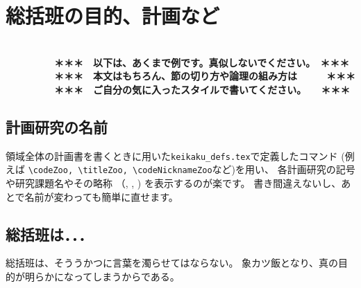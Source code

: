 \documentclass[11pt,a4j,dvipdfmx]{jarticle} 					%
\newcommand{\研究課題名}{象の卵}
\newcommand{\研究機関名}{逢坂大学}
\newcommand{\研究代表者氏名}{湯川秀樹}
\newcommand{\研究期間の最終元号年度}{7}  %
\begin{document}

\section{総括班の目的、計画など}

\JSPSInstructions	%

\textbf{\\　　　　　＊＊＊　以下は、あくまで例です。真似しないでください。　＊＊＊\\
　　　　　＊＊＊　本文はもちろん、節の切り方や論理の組み方は　　　＊＊＊\\
　　　　　＊＊＊　ご自分の気に入ったスタイルで書いてください。　　＊＊＊}

\subsection{計画研究の名前}
        領域全体の計画書を書くときに用いた\texttt{keikaku\_defs.tex}で定義したコマンド
        (例えば
        \texttt{\textbackslash codeZoo, \textbackslash titleZoo, \textbackslash codeNicknameZoo}など)を用い、
        各計画研究の記号や研究課題名やその略称
        （\codeZoo, \titleZoo, \codeNicknameZoo)
        を表示するのが楽です。
       書き間違えないし、あとで名前が変わっても簡単に直せます。

\subsection{総括班は．．．}
        総括班は、そううかつに言葉を濁らせてはならない。
        象カツ飯となり、真の目的が明らかになってしまうからである。




\end{document}
